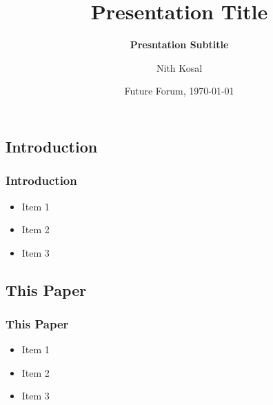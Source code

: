 \documentclass[11pt]{beamer}
\begin{document}
	\author[Nith Kosal]{Nith Kosal}
	\title[Presentation Title]{\bfseries Presentation Title}
	\subtitle{\bfseries Presntation Subtitle}

	
	\date[\today]{Future Forum, \today}

	\begin{frame}[plain]
		\maketitle
		
	\end{frame}
	\setcounter{framenumber}{0}
	\begin{frame}
		\section{Introduction}
		\frametitle{\bfseries Introduction}
		
		\begin{itemize}
			\item Item 1
			\item Item 2
			\item Item 3
		\end{itemize}
	\end{frame}
	
	\begin{frame}
		\section[]{This Paper}
		\frametitle{\bfseries This Paper}
		
		\begin{itemize}
			\item Item 1
			\item Item 2
			\item Item 3
		\end{itemize}

	\end{frame}
\end{document}
